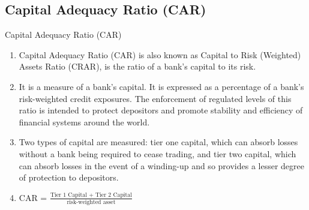 \documentclass{beamer}
\begin{document}
\subsection{Capital Adequacy Ratio (CAR)}
\begin{frame}{Capital Adequacy Ratio (CAR)}
		\begin{enumerate}
	\item Capital Adequacy Ratio (CAR) is also known as Capital to Risk (Weighted) Assets Ratio (CRAR), is the ratio of a bank's capital to its risk.
	\item It is a measure of a bank's capital. It is expressed as a percentage of a bank's risk-weighted credit exposures. The enforcement of regulated levels of this ratio is intended to protect depositors and promote stability and efficiency of financial systems around the world.
	\item Two types of capital are measured: tier one capital, which can absorb losses without a bank being required to cease trading, and tier two capital, which can absorb losses in the event of a winding-up and so provides a lesser degree of protection to depositors.
	\item CAR = $\frac{\text{Tier 1 Capital + Tier 2 Capital}}{\text{risk-weighted asset}}$
	\end{enumerate}
\end{frame}
\end{document}

